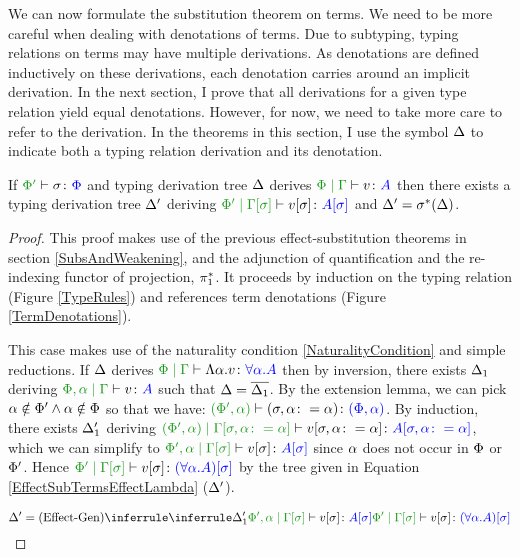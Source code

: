 \documentclass{Report}
\begin{document}
We can now formulate the substitution theorem on terms. We need to be more careful when dealing with denotations of terms. Due to subtyping, typing relations on terms may have multiple derivations. As denotations are defined inductively on these derivations, each denotation carries around an implicit derivation. In the next section, I prove that all derivations for a given type relation yield equal denotations. However, for now, we need to take more care to refer to the derivation. In the theorems in this section, I use the symbol $\D$ to indicate both a typing relation derivation and its denotation.


\begin{framed}
    \begin{theorem}\label{EffectSubstitutionOnTerms}
        If $\typerelation{\P'}{\si}{\P}$ and typing derivation tree $\D$ derives $\gpetyperelation{v}{A}$ then there exists a typing derivation tree  $\D'$ deriving $\etyperelation{\P'}{\G\ssi}{v\ssi}{A\ssi}$ and $\D' = \si\star(\D)$.
    \end{theorem}
    
    
    \begin{proof}
        This proof makes use of the previous effect-substitution theorems in section \ref{SubsAndWeakening}, and the adjunction of quantification and the re-indexing functor of projection, $\pstar$. It proceeds by induction on the typing relation (Figure \ref{TypeRules}) and references term denotations (Figure \ref{TermDenotations}).
    
        \case{\vgen}
    
    This case makes use of the naturality condition \ref{NaturalityCondition} and simple reductions. 
    If $\D$ derives $\gpetyperelation{\elam{\a}{v}}{\all{\a}{A}}$ then by inversion, there exists $\D_1$ deriving  $\etyperelation{\P,\a}{\G}{v}{A}$ such that $\D = \bar{\D_1}$. By the extension lemma, we can pick $\a\notin\P'\wedge\a\notin\P$ so that we have: $\typerelation{(\P',\a)}{(\si, \a\setto\a)}{(\P,\a)}$. By induction, there exists $\D_1'$ deriving $\etyperelation{(\P', \a)}{\G\sub{\si, \a\setto\a}}{v\sub{\si,\a\setto\a}}{A\sub{\si, \a\setto\a}}$, which we can simplify to $\etyperelation{\P',\a}{\G\ssi}{v\ssi}{A\ssi}$ since $\a$ does not occur in $\P$ or $\P'$. Hence $\etyperelation{\P'}{\G\ssi}{v\ssi}{(\all{\a}{A})\ssi}$ by the tree given in Equation \ref{EffectSubTermsEffectLambda} ($\D'$).
    
    \begin{equation}\label{EffectSubTermsEffectLambda}
        \D' = \ntreeruleI{\vgen}{\treeruleI{\D_1'}{\etyperelation{\P',\a}{\G\ssi}{v\ssi}{A\ssi}}}{\etyperelation{\P'}{\G\ssi}{v\ssi}{(\all{\a}{A})\ssi}}
    \end{equation}
    

\end{proof}
\end{framed}
\end{document}
